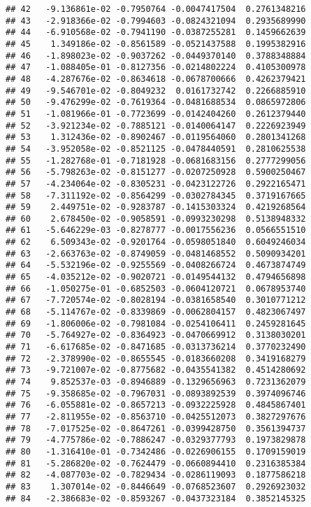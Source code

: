 \documentclass[
]{article}
\begin{document}
\begin{verbatim}
## 42   -9.136861e-02 -0.7950764 -0.0047417504  0.2761348216
## 43   -2.918366e-02 -0.7994603 -0.0824321094  0.2935689990
## 44   -6.910568e-02 -0.7941190 -0.0387255281  0.1459662639
## 45    1.349186e-02 -0.8561589 -0.0521437588  0.1995382916
## 46   -1.898023e-02 -0.9037262 -0.0449370140  0.3788348884
## 47   -1.088405e-01 -0.8127356 -0.0214802224  0.4105300978
## 48   -4.287676e-02 -0.8634618 -0.0678700666  0.4262379421
## 49   -9.546701e-02 -0.8049232  0.0161732742  0.2266885910
## 50   -9.476299e-02 -0.7619364 -0.0481688534  0.0865972806
## 51   -1.081966e-01 -0.7723699 -0.0142404260  0.2612379440
## 52   -3.921234e-02 -0.7885121 -0.0140064147  0.2226923949
## 53    1.312436e-02 -0.8902467 -0.0119564060  0.2801341268
## 54   -3.952058e-02 -0.8521125 -0.0478440591  0.2810625538
## 55   -1.282768e-01 -0.7181928 -0.0681683156  0.2777299056
## 56   -5.798263e-02 -0.8151277 -0.0207250928  0.5900250467
## 57   -4.234064e-02 -0.8305231 -0.0423122726  0.2922165471
## 58   -7.311192e-02 -0.8564299 -0.0302784345  0.3719167665
## 59    2.449751e-02 -0.9283787 -0.1415303324  0.4219268564
## 60    2.678450e-02 -0.9058591 -0.0993230298  0.5138948332
## 61   -5.646229e-03 -0.8278777 -0.0017556236  0.0566551510
## 62    6.509343e-02 -0.9201764 -0.0598051840  0.6049246034
## 63   -2.663763e-02 -0.8749059 -0.0481468552  0.5090934201
## 64   -5.532196e-02 -0.9255569 -0.0408266724  0.4673874749
## 65   -4.035212e-02 -0.9020721 -0.0149544132  0.4794656898
## 66   -1.050275e-01 -0.6852503 -0.0604120721  0.0678953740
## 67   -7.720574e-02 -0.8028194 -0.0381658540  0.3010771212
## 68   -5.114767e-02 -0.8339869 -0.0062804157  0.4823067497
## 69   -1.806006e-02 -0.7981084 -0.0254106411  0.2459281645
## 70   -5.764927e-02 -0.8364923 -0.0470669912  0.3138030201
## 71   -6.617685e-02 -0.8471685 -0.0313736214  0.3770232490
## 72   -2.378990e-02 -0.8655545 -0.0183660208  0.3419168279
## 73   -9.721007e-02 -0.8775682 -0.0435541382  0.4514280692
## 74    9.852537e-03 -0.8946889 -0.1329656963  0.7231362079
## 75   -9.358685e-02 -0.7967031 -0.0893892539  0.3974096746
## 76   -6.055881e-02 -0.8657213 -0.0932225928  0.4845867401
## 77   -2.811955e-02 -0.8563710 -0.0425512073  0.3827297676
## 78   -7.017525e-02 -0.8647261 -0.0399428750  0.3561394737
## 79   -4.775786e-02 -0.7886247 -0.0329377793  0.1973829878
## 80   -1.316410e-01 -0.7342486 -0.0226906155  0.1709159019
## 81   -5.286820e-02 -0.7624479 -0.0660894410  0.2316385384
## 82   -4.087703e-02 -0.7829434 -0.0286119093  0.1877586218
## 83    1.307014e-02 -0.8446649 -0.0768523607  0.2926923032
## 84   -2.386683e-02 -0.8593267 -0.0437323184  0.3852145325

\end{verbatim}
\end{document}
